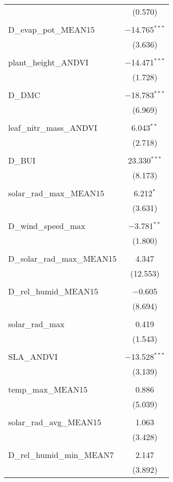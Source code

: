 \begin{table}[!htbp]
\begin{tabular}{@{\extracolsep{5pt}}lc}
  & (0.570) \\ 
  & \\ 
 D\_evap\_pot\_MEAN15 & $-$14.765$^{***}$ \\ 
  & (3.636) \\ 
  & \\ 
 plant\_height\_ANDVI & $-$14.471$^{***}$ \\ 
  & (1.728) \\ 
  & \\ 
 D\_DMC & $-$18.783$^{***}$ \\ 
  & (6.969) \\ 
  & \\ 
 leaf\_nitr\_mass\_ANDVI & 6.043$^{**}$ \\ 
  & (2.718) \\ 
  & \\ 
 D\_BUI & 23.330$^{***}$ \\ 
  & (8.173) \\ 
  & \\ 
 solar\_rad\_max\_MEAN15 & 6.212$^{*}$ \\ 
  & (3.631) \\ 
  & \\ 
 D\_wind\_speed\_max & $-$3.781$^{**}$ \\ 
  & (1.800) \\ 
  & \\ 
 D\_solar\_rad\_max\_MEAN15 & 4.347 \\ 
  & (12.553) \\ 
  & \\ 
 D\_rel\_humid\_MEAN15 & $-$0.605 \\ 
  & (8.694) \\ 
  & \\ 
 solar\_rad\_max & 0.419 \\ 
  & (1.543) \\ 
  & \\ 
 SLA\_ANDVI & $-$13.528$^{***}$ \\ 
  & (3.139) \\ 
  & \\ 
 temp\_max\_MEAN15 & 0.886 \\ 
  & (5.039) \\ 
  & \\ 
 solar\_rad\_avg\_MEAN15 & 1.063 \\ 
  & (3.428) \\ 
  & \\ 
 D\_rel\_humid\_min\_MEAN7 & 2.147 \\ 
  & (3.892) \\ 

\end{tabular}
\end{table}
